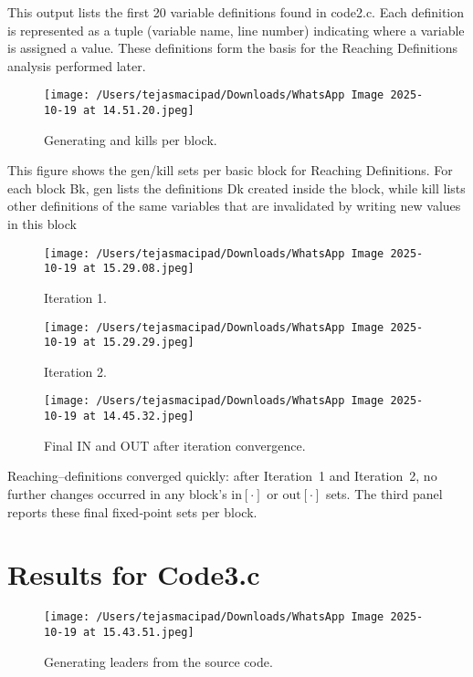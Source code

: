 \documentclass[12pt, a4paper]{report}
\begin{document}
\noindent This output lists the first 20 variable definitions found in code2.c. Each definition is represented as a tuple (variable name, line number) indicating where a variable is assigned a value. These definitions form the basis for the Reaching Definitions analysis performed later.

\begin{figure}[H]
\centering
\texttt{[image: /Users/tejasmacipad/Downloads/WhatsApp Image 2025-10-19 at 14.51.20.jpeg]}
\caption{Generating and kills per block.}
\label{fig:diff-example-77}
\end{figure}

\noindent This figure shows the gen/kill sets per basic block for Reaching Definitions. For each block Bk, gen lists the definitions Dk created inside the block, while kill lists other definitions of the same variables that are invalidated by writing new values in this block

\begin{figure}[H]
\centering
\texttt{[image: /Users/tejasmacipad/Downloads/WhatsApp Image 2025-10-19 at 15.29.08.jpeg]}
\caption{Iteration 1.}
\label{fig:diff-example-78}
\end{figure}


\begin{figure}[H]
\centering
\texttt{[image: /Users/tejasmacipad/Downloads/WhatsApp Image 2025-10-19 at 15.29.29.jpeg]}
\caption{Iteration 2.}
\label{fig:diff-example-79}
\end{figure}

\begin{figure}[H]
\centering
\texttt{[image: /Users/tejasmacipad/Downloads/WhatsApp Image 2025-10-19 at 14.45.32.jpeg]}
\caption{Final IN and OUT after iteration convergence.}
\label{fig:diff-example-76}
\end{figure}

\noindent
Reaching–definitions converged quickly: after Iteration~1 and Iteration~2, no further changes occurred in any block’s \(\mathrm{in}[\cdot]\) or \(\mathrm{out}[\cdot]\) sets. The third panel reports these final fixed‑point sets per block.

\clearpage
\section{Results for Code3.c}

\begin{figure}[H]
\centering
\texttt{[image: /Users/tejasmacipad/Downloads/WhatsApp Image 2025-10-19 at 15.43.51.jpeg]}
\caption{Generating leaders from the source code.}
\label{fig:diff-example-80}
\end{figure}
\end{document}
